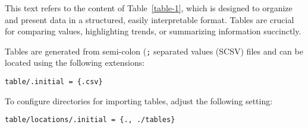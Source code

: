 This text refers to the content of Table~\ref{table-1}, which is designed to organize and present data in a structured, easily interpretable format. Tables are crucial for comparing values, highlighting trends, or summarizing information succinctly.

Tables are generated from semi-colon (\texttt{;} separated values (SCSV) files and can be located using the following extensions:

\begin{verbatim}
table/.initial = {.csv}
\end{verbatim}

To configure directories for importing tables, adjust the following setting:

\begin{verbatim}
table/locations/.initial = {., ./tables}
\end{verbatim}
